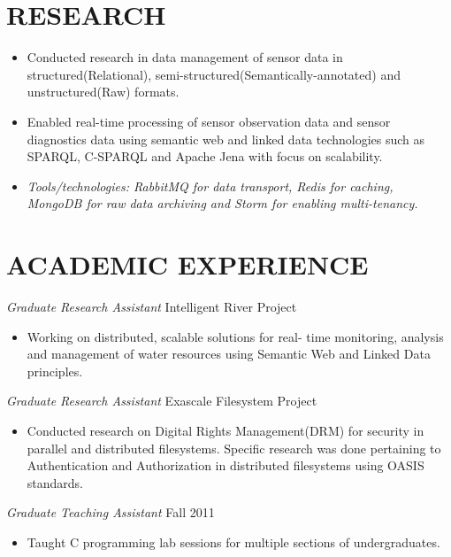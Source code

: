 \documentclass[line,margin]{res}
\begin{document}
\begin{resume}
		\section{RESEARCH}	\begin{itemize}  \itemsep -2pt
			\item Conducted research in data management of sensor data in structured(Relational), semi-structured(Semantically-annotated) and unstructured(Raw) formats. 
			\item Enabled real-time processing of sensor observation data and sensor diagnostics data using semantic web and linked data technologies such as SPARQL, C-SPARQL and Apache Jena with focus on scalability.
			\item \emph{Tools/technologies: RabbitMQ for data transport, Redis for caching, MongoDB for raw data archiving and Storm for enabling multi-tenancy.}
		\end{itemize}
		
		\section{ACADEMIC EXPERIENCE}  {\sl Graduate Research Assistant} \hfill        Intelligent River\textsuperscript{\textregistered} Project
		\begin{itemize}  \itemsep -2pt
			\item Working on distributed, scalable solutions for real- time monitoring, analysis and management of water resources using Semantic Web and Linked Data principles.
		\end{itemize}
		
		{\sl Graduate Research Assistant} \hfill        Exascale Filesystem Project
		\begin{itemize}  \itemsep -2pt
			\item Conducted research on Digital Rights Management(DRM) for security in parallel and distributed filesystems. Specific research was done pertaining to Authentication and Authorization in distributed filesystems using OASIS standards.
		\end{itemize}
		
		{\sl Graduate Teaching Assistant} \hfill        Fall 2011
		\begin{itemize}  \itemsep -2pt
			\item Taught C programming lab sessions for multiple sections of undergraduates.
		\end{itemize}
		
		

\end{resume}
\end{document}
